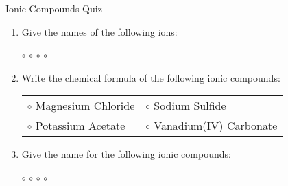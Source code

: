 \documentclass[14pt, openany, letterpaper]{memoir}
\begin{document}
\begin{center}
{\Large Ionic Compounds Quiz}
\end{center}

\begin{enumerate}
	\item Give the names of the following ions:

	$\circ$  \hspace{4em} $\circ$  \hspace{4em} $\circ$  \hspace{4em} $\circ$ 

	\vspace{2em}
	\item Write the chemical formula of the following ionic compounds:
	
	\begin{tabular}{ll}
	$\circ$ Magnesium Chloride \hspace{4em} &$\circ$ Sodium Sulfide  \\
	
	$\circ$ Potassium Acetate \hspace{4em} &$\circ$ Vanadium(IV) Carbonate
	\end{tabular}
	
	\vspace{2em}
	\item Give the name for the following ionic compounds:
	
	$\circ$  \hspace{4em} $\circ$  \hspace{4em} $\circ$  \hspace{4em} $\circ$ 
\end{enumerate}
\end{document}
